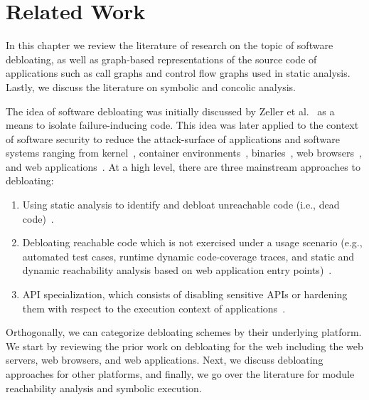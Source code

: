 \chapter{Related Work}
\label{chap:relatedwork}

In this chapter we review the literature of research on the topic of software debloating, as well as graph-based representations of the source code of applications such as call graphs and control flow graphs used in static analysis. 
Lastly, we discuss the literature on symbolic and concolic analysis. 

The idea of software debloating was initially discussed by Zeller et al.~\cite{zeller2002simplifying} as a means to isolate failure-inducing code. 
This idea was later applied to the context of software security to reduce the attack-surface of applications and software systems ranging from kernel~\cite{abubakar2021shard}, container environments~\cite{rastogi2017Cimplifier,259711}, binaries~\cite{hasan2022decap, redini2019b, heo2018effective,ghavamnia2020temporal, mishra2020saffire, koo2019configuration, quach2018debloating}, web browsers~\cite{snyder2017most, qian2020slimium}, and web applications~\cite{azad2019less, bulekov2021saphire, mininode, jahanshahi2020you}. 
At a high level, there are three mainstream approaches to debloating: 

\begin{enumerate}
    \item Using static analysis to identify and debloat unreachable code (i.e., dead code)~\cite{redini2019b, snyder2017most, quach2018debloating, mininode, 255308}.
    \item Debloating reachable code which is not exercised under a usage scenario (e.g., automated test cases, runtime dynamic code-coverage traces, and static and dynamic reachability analysis based on web application entry points)~\cite{lessismore, heo2018effective,qian2020slimium, koo2019configuration}.
    \item API specialization, which consists of disabling sensitive APIs or hardening them with respect to the execution context of applications~\cite{mishra2020saffire, saphire, jahanshahi2020you, mishra2021sgxpecial}. 
\end{enumerate}

Orthogonally, we can categorize debloating schemes by their underlying platform. 
We start by reviewing the prior work on debloating for the web including the web servers, web browsers, and web applications. 
Next, we discuss debloating approaches for other platforms, and finally, we go over the literature for module reachability analysis and symbolic execution. 


